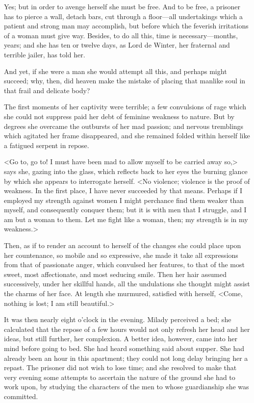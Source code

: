 Yes; but in order to avenge herself she must be free. And to be free, a prisoner has to pierce a wall, detach bars, cut through a floor—all undertakings which a patient and strong man may accomplish, but before which the feverish irritations of a woman must give way. Besides, to do all this, time is necessary—months, years; and she has ten or twelve days, as Lord de Winter, her fraternal and terrible jailer, has told her. 

And yet, if she were a man she would attempt all this, and perhaps might succeed; why, then, did heaven make the mistake of placing that manlike soul in that frail and delicate body? 

The first moments of her captivity were terrible; a few convulsions of rage which she could not suppress paid her debt of feminine weakness to nature. But by degrees she overcame the outbursts of her mad passion; and nervous tremblings which agitated her frame disappeared, and she remained folded within herself like a fatigued serpent in repose. 

<Go to, go to! I must have been mad to allow myself to be carried away so,> says she, gazing into the glass, which reflects back to her eyes the burning glance by which she appears to interrogate herself. <No violence; violence is the proof of weakness. In the first place, I have never succeeded by that means. Perhaps if I employed my strength against women I might perchance find them weaker than myself, and consequently conquer them; but it is with men that I struggle, and I am but a woman to them. Let me fight like a woman, then; my strength is in my weakness.> 

Then, as if to render an account to herself of the changes she could place upon her countenance, so mobile and so expressive, she made it take all expressions from that of passionate anger, which convulsed her features, to that of the most sweet, most affectionate, and most seducing smile. Then her hair assumed successively, under her skillful hands, all the undulations she thought might assist the charms of her face. At length she murmured, satisfied with herself, <Come, nothing is lost; I am still beautiful.> 

It was then nearly eight o'clock in the evening. Milady perceived a bed; she calculated that the repose of a few hours would not only refresh her head and her ideas, but still further, her complexion. A better idea, however, came into her mind before going to bed. She had heard something said about supper. She had already been an hour in this apartment; they could not long delay bringing her a repast. The prisoner did not wish to lose time; and she resolved to make that very evening some attempts to ascertain the nature of the ground she had to work upon, by studying the characters of the men to whose guardianship she was committed. 

